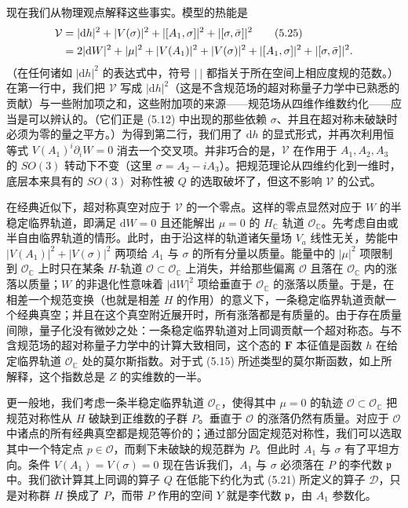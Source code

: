 \documentclass[11pt,a4paper,UTF8]{ctexart}
\theoremstyle{plain}
\theoremstyle{definition}
\begin{document}
现在我们从物理观点解释这些事实。模型的热能是
\begin{align}
    \mathcal V&=|\mathrm dh|^2+|V(\sigma)|^2+|[A_1,\sigma]|^2+|[\sigma,\bar\sigma]|^2 \tag{5.25}\\
    &=2|\mathrm dW|^2+|\mu|^2+|V(A_1)|^2+|V(\sigma)|^2+|[A_1,\sigma]|^2+|[\sigma,\bar\sigma]|^2. \notag
\end{align}
（在任何诸如 $|\mathrm dh|^2$ 的表达式中，符号 $|\ |$ 都指关于所在空间上相应度规的范数。）在第一行中，我们把 $\mathcal V$ 写成 $|\mathrm dh|^2$（这是不含规范场的超对称量子力学中已熟悉的贡献）与一些附加项之和，这些附加项的来源——规范场从四维作维数约化——应当是可以辨认的。（它们正是 (5.12) 中出现的那些依赖 $\sigma$、并且在超对称未破缺时必须为零的量之平方。）为得到第二行，我们用了 $\mathrm dh$ 的显式形式，并再次利用恒等式 $V(A_1)^i\partial_iW=0$ 消去一个交叉项。并非巧合的是，$\mathcal V$ 在作用于 $A_1,A_2,A_3$ 的 $SO(3)$ 转动下不变（这里 $\sigma=A_2-iA_3$）。把规范理论从四维约化到一维时，底层本来具有的 $SO(3)$ 对称性被 $Q$ 的选取破坏了，但这不影响 $\mathcal V$ 的公式。

在经典近似下，超对称真空对应于 $\mathcal V$ 的一个零点。这样的零点显然对应于 $W$ 的半稳定临界轨道，即满足 $\mathrm dW=0$ 且还能解出 $\mu=0$ 的 $H_{\mathbb C}$ 轨道 $\mathcal O_{\mathbb C}$。先考虑自由或半自由临界轨道的情形。此时，由于沿这样的轨道诸矢量场 $V_a$ 线性无关，势能中 $|V(A_1)|^2+|V(\sigma)|^2$ 两项给 $A_1$ 与 $\sigma$ 的所有分量以质量。能量中的 $|\mu|^2$ 项限制到 $\mathcal O_{\mathbb C}$ 上时只在某条 $H$-轨道 $\mathcal O\subset\mathcal O_{\mathbb C}$ 上消失，并给那些偏离 $\mathcal O$ 且落在 $\mathcal O_{\mathbb C}$ 内的涨落以质量；$W$ 的非退化性意味着 $|\mathrm dW|^2$ 项给垂直于 $\mathcal O_{\mathbb C}$ 的涨落以质量。于是，在相差一个规范变换（也就是相差 $H$ 的作用）的意义下，一条稳定临界轨道贡献一个经典真空；并且在这个真空附近展开时，所有涨落都是有质量的。由于存在质量间隙，量子化没有微妙之处：一条稳定临界轨道对上同调贡献一个超对称态。与不含规范场的超对称量子力学中的计算大致相同，这个态的 $\mathbf F$ 本征值是函数 $h$ 在给定临界轨道 $\mathcal O_{\mathbb C}$ 处的莫尔斯指数。对于式 (5.15) 所述类型的莫尔斯函数，如上所解释，这个指数总是 $Z$ 的实维数的一半。

更一般地，我们考虑一条半稳定临界轨道 $\mathcal O_{\mathbb C}$，使得其中 $\mu=0$ 的轨迹 $\mathcal O\subset\mathcal O_{\mathbb C}$ 把规范对称性从 $H$ 破缺到正维数的子群 $P$。垂直于 $\mathcal O$ 的涨落仍然有质量。对应于 $\mathcal O$ 中诸点的所有经典真空都是规范等价的；通过部分固定规范对称性，我们可以选取其中一个特定点 $p\in\mathcal O$，而剩下未破缺的规范群为 $P$。但此时 $A_1$ 与 $\sigma$ 有了平坦方向。条件 $V(A_1)=V(\sigma)=0$ 现在告诉我们，$A_1$ 与 $\sigma$ 必须落在 $P$ 的李代数 $\mathfrak p$ 中。我们欲计算其上同调的算子 $Q$ 在低能下约化为式 (5.21) 所定义的算子 $\mathcal D$，只是对称群 $H$ 换成了 $P$，而带 $P$ 作用的空间 $Y$ 就是李代数 $\mathfrak p$，由 $A_1$ 参数化。
\end{document}
